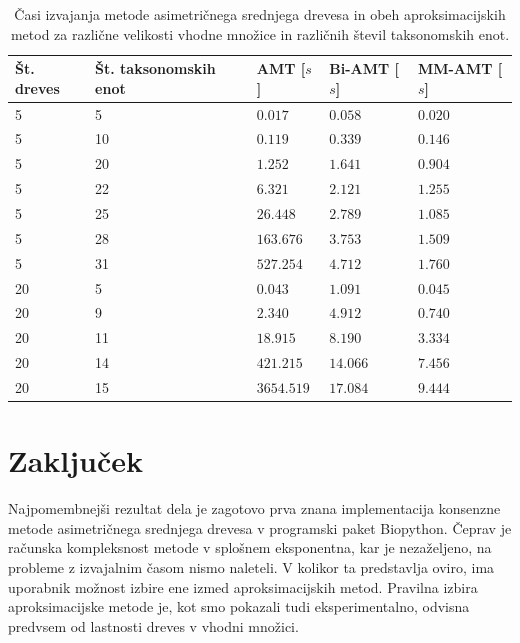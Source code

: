 \documentclass[a4paper, 12pt]{book}
\begin{document}
\begin{table}[h!]
	\begin{center}
	{\footnotesize
	\begin{tabular}{ l| l | l | l | l }
	Št. dreves       & Št. taksonomskih enot & AMT [$s$] & Bi-AMT [$s$] & MM-AMT [$s$] \\ \hline
	5                & 5                     & $0.017$   & $0.058$      & $0.020$      \\ \hline
	5                & 10                    & $0.119$   & $0.339$      & $0.146$      \\ \hline
	5                & 20                    & $1.252$   & $1.641$      & $0.904$      \\ \hline
	5                & 22                    & $6.321$   & $2.121$      & $1.255$      \\ \hline
	5                & 25                    & $26.448$  & $2.789$      & $1.085$      \\ \hline
	5                & 28                    & $163.676$ & $3.753$      & $1.509$      \\ \hline
	5                & 31                    & $527.254$ & $4.712$      & $1.760$      \\ \hline
	20               & 5                     & $0.043$   & $1.091$      & $0.045$      \\ \hline
	20               & 9                     & $2.340$   & $4.912$      & $0.740$      \\ \hline
	20               & 11                    & $18.915$  & $8.190$      & $3.334$      \\ \hline
	20               & 14                    & $421.215$ & $14.066$     & $7.456$      \\ \hline
	20               & 15                    & $3654.519$ & $17.084$    & $9.444$      \\ \hline
	\end{tabular}
	\caption{Časi izvajanja metode asimetričnega srednjega drevesa in obeh aproksimacijskih metod za različne velikosti vhodne množice in različnih števil taksonomskih enot.}
	}
	\label{table-timing-1}
	\end{center}		
\end{table}


\chapter{Zaključek}
Najpomembnejši rezultat dela je zagotovo prva znana implementacija konsenzne metode asimetričnega srednjega drevesa v programski paket Biopython. Čeprav je računska kompleksnost metode v splošnem eksponentna, kar je nezaželjeno, na probleme z izvajalnim časom nismo naleteli. V kolikor ta predstavlja oviro, ima uporabnik možnost izbire ene izmed aproksimacijskih metod. Pravilna izbira aproksimacijske metode je, kot smo pokazali tudi eksperimentalno, odvisna predvsem od lastnosti dreves v vhodni množici. 
\end{document}
